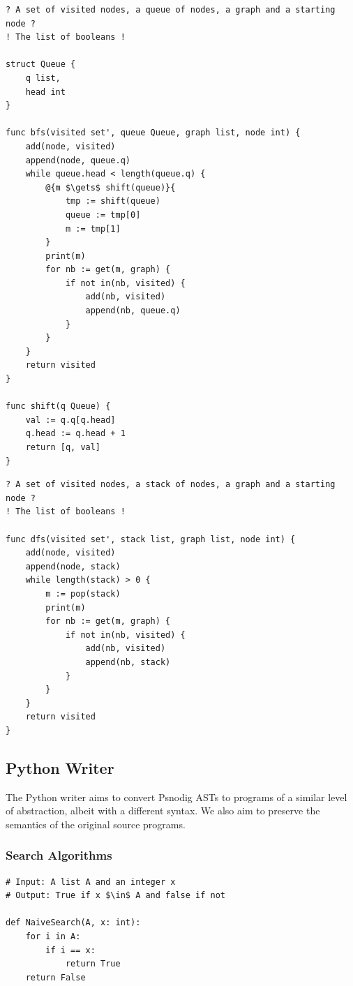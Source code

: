 \begin{lstlisting}[caption={The result of transpiling \Cref{bfsGourmet} back to Gourmet.}, captionpos=b, label={bfsGourmet2}]
? A set of visited nodes, a queue of nodes, a graph and a starting node ?
! The list of booleans !

struct Queue {
    q list,
    head int
}

func bfs(visited set', queue Queue, graph list, node int) {
    add(node, visited)
    append(node, queue.q)
    while queue.head < length(queue.q) {
        @{m $\gets$ shift(queue)}{
            tmp := shift(queue)
            queue := tmp[0]
            m := tmp[1]
        }
        print(m)
        for nb := get(m, graph) {
            if not in(nb, visited) {
                add(nb, visited)
                append(nb, queue.q)
            }
        }
    }
    return visited
}

func shift(q Queue) {
    val := q.q[q.head]
    q.head := q.head + 1
    return [q, val]
}
\end{lstlisting}

\begin{lstlisting}[caption={The result of transpiling \Cref{dfsGourmet} back to Gourmet.}, captionpos=b, label={dfsGourmet2}]
? A set of visited nodes, a stack of nodes, a graph and a starting node ?
! The list of booleans !

func dfs(visited set', stack list, graph list, node int) {
    add(node, visited)
    append(node, stack)
    while length(stack) > 0 {
        m := pop(stack)
        print(m)
        for nb := get(m, graph) {
            if not in(nb, visited) {
                add(nb, visited)
                append(nb, stack)
            }
        }
    }
    return visited
}
\end{lstlisting}

\subsection{Python Writer}

The Python writer aims to convert Psnodig ASTs to programs of a similar level of abstraction, albeit with a different syntax. We also aim to preserve the semantics of the original source programs.

\subsubsection{Search Algorithms}

\begin{lstlisting}[caption={The result of transpiling \Cref{naiveSearchGourmet} to Python.}, captionpos=b, label={naiveSearchPython}]
# Input: A list A and an integer x
# Output: True if x $\in$ A and false if not

def NaiveSearch(A, x: int):
    for i in A:
        if i == x:
            return True
    return False
\end{lstlisting}

